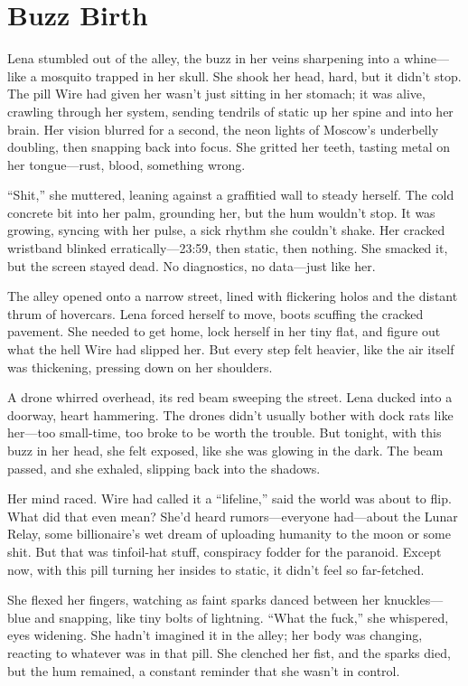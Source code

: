 \documentclass[12pt]{book}
\begin{document}
\section{Buzz Birth}

Lena stumbled out of the alley, the buzz in her veins sharpening into a whine---like a mosquito trapped in her skull. She shook her head, hard, but it didn’t stop. The pill Wire had given her wasn’t just sitting in her stomach; it was alive, crawling through her system, sending tendrils of static up her spine and into her brain. Her vision blurred for a second, the neon lights of Moscow’s underbelly doubling, then snapping back into focus. She gritted her teeth, tasting metal on her tongue---rust, blood, something wrong.

``Shit,'' she muttered, leaning against a graffitied wall to steady herself. The cold concrete bit into her palm, grounding her, but the hum wouldn’t stop. It was growing, syncing with her pulse, a sick rhythm she couldn’t shake. Her cracked wristband blinked erratically---23:59, then static, then nothing. She smacked it, but the screen stayed dead. No diagnostics, no data---just like her.

The alley opened onto a narrow street, lined with flickering holos and the distant thrum of hovercars. Lena forced herself to move, boots scuffing the cracked pavement. She needed to get home, lock herself in her tiny flat, and figure out what the hell Wire had slipped her. But every step felt heavier, like the air itself was thickening, pressing down on her shoulders.

A drone whirred overhead, its red beam sweeping the street. Lena ducked into a doorway, heart hammering. The drones didn’t usually bother with dock rats like her---too small-time, too broke to be worth the trouble. But tonight, with this buzz in her head, she felt exposed, like she was glowing in the dark. The beam passed, and she exhaled, slipping back into the shadows.

Her mind raced. Wire had called it a ``lifeline,'' said the world was about to flip. What did that even mean? She’d heard rumors---everyone had---about the Lunar Relay, some billionaire’s wet dream of uploading humanity to the moon or some shit. But that was tinfoil-hat stuff, conspiracy fodder for the paranoid. Except now, with this pill turning her insides to static, it didn’t feel so far-fetched.

She flexed her fingers, watching as faint sparks danced between her knuckles---blue and snapping, like tiny bolts of lightning. ``What the fuck,'' she whispered, eyes widening. She hadn’t imagined it in the alley; her body was changing, reacting to whatever was in that pill. She clenched her fist, and the sparks died, but the hum remained, a constant reminder that she wasn’t in control.
\end{document}
